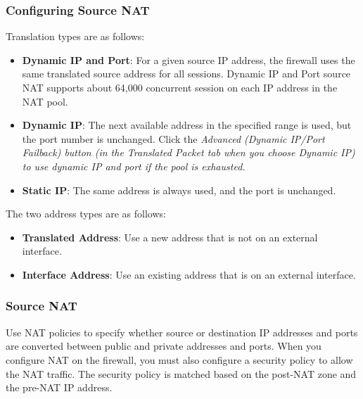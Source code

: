 \subsubsection{Configuring Source NAT}
Translation types are as follows:
    \begin{itemize}
        \item \textbf{Dynamic IP and Port}:  For a given source IP address, the firewall uses the same translated source address for all sessions. Dynamic IP and Port source NAT supports about 64,000 concurrent session on each IP address in the NAT pool.
        \item \textbf{Dynamic IP}:  The next available address in the specified range is used, but the port number is unchanged. Click the \textit{Advanced (Dynamic IP/Port Failback) button (in the Translated Packet tab when you choose Dynamic IP) to use dynamic IP and port if the pool is exhausted.}
        \item \textbf{Static IP}: The same address is always used, and the port is unchanged.
    \end{itemize}
The two address types are as follows:
    \begin{itemize}
        \item \textbf{Translated Address}:  Use a new address that is not on an external interface.
        \item \textbf{Interface Address}:  Use an existing address that is on an external interface.
    \end{itemize}
\subsubsection{Source NAT}
Use NAT policies to specify whether source or destination IP addresses and ports are converted between public and private addresses and ports.
When you configure NAT on the firewall, you must also configure a security policy to allow the NAT traffic. The security policy is matched based on the post-NAT zone and the pre-NAT IP address.
